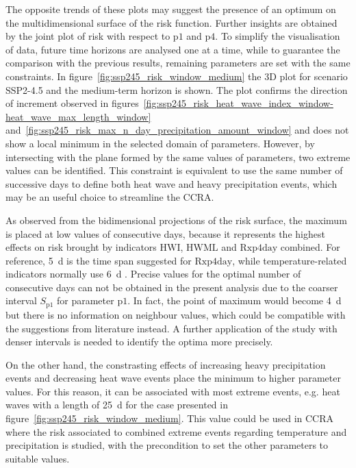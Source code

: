 The opposite trends of these plots may suggest the presence of an optimum on the multidimensional surface of the risk function. Further insights are obtained by the joint plot of risk with respect to $\mathrm{p1}$ and $\mathrm{p4}$. To simplify the visualisation of data, future time horizons are analysed one at a time, while to guarantee the comparison with the previous results, remaining parameters are set with the same constraints. In figure~\ref{fig:ssp245_risk_window_medium} the 3D plot for scenario SSP2-4.5 and the medium-term horizon is shown. The plot confirms the direction of increment observed in figures~\ref{fig:ssp245_risk_heat_wave_index_window-heat_wave_max_length_window} and~\ref{fig:ssp245_risk_max_n_day_precipitation_amount_window} and does not show a local minimum in the selected domain of parameters. However, by intersecting with the plane formed by the same values of parameters, two extreme values can be identified. This constraint is equivalent to use the same number of successive days to define both heat wave and heavy precipitation events, which may be an useful choice to streamline the \gls{CCRA}.

As observed from the bidimensional projections of the risk surface, the maximum is placed at low values of consecutive days, because it represents the highest effects on risk brought by indicators $\mathrm{HWI}$, $\mathrm{HWML}$ and $\mathrm{Rxp4day}$ combined. For reference, \qty{5}{\day} is the time span suggested for $\mathrm{Rxp4day}$, while temperature-related indicators normally use \qty{6}{\day} \cite[2208]{2021GutierrezAnnexVI}.
Precise values for the optimal number of consecutive days can not be obtained in the present analysis due to the coarser interval $S_\mathrm{p1}$ for parameter $\mathrm{p1}$. In fact, the point of maximum would become \qty{4}{\day} but there is no information on neighbour values, which could be compatible with the suggestions from literature instead. A further application of the study with denser intervals is needed to identify the optima more precisely.

On the other hand, the constrasting effects of increasing heavy precipitation events and decreasing heat wave events place the minimum to higher parameter values. For this reason, it can be associated with most extreme events, e.g. heat waves with a length of \qty{25}{\day} for the case presented in figure~\ref{fig:ssp245_risk_window_medium}.
This value could be used in \gls{CCRA} where the risk associated to combined extreme events regarding temperature and precipitation is studied, with the precondition to set the other parameters to suitable values.

